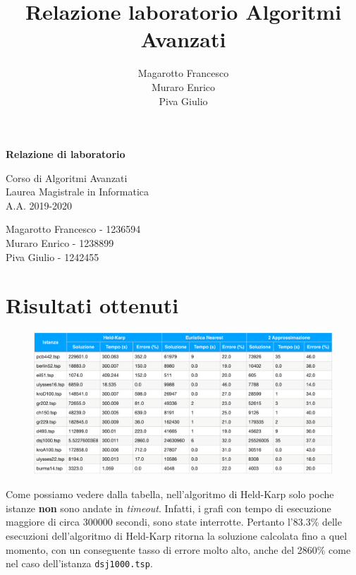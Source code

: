 \documentclass[a4paper]{article}
\title{Relazione laboratorio Algoritmi Avanzati}
\author{Magarotto Francesco\\Muraro Enrico\\Piva Giulio}
\begin{document}
\begin{titlepage}
  \vspace*{5cm}
  \begin{center}
    \Large\bfseries
    Relazione di laboratorio
  \end{center}
  \begin{center}
    \large
    Corso di Algoritmi Avanzati\\
    Laurea Magistrale in Informatica\\A.A. 2019-2020
  \end{center}
  \vspace{4cm plus 1fill}
  \begin{flushleft}
    \large
    Magarotto Francesco - 1236594\\Muraro Enrico - 1238899 \\Piva Giulio - 1242455
  \end{flushleft}
\end{titlepage}
\newpage


\section{Risultati ottenuti}
\begin{figure}[H]
	\centering
	\includegraphics[width=17cm]{tabellapdf}
\end{figure}
Come possiamo vedere dalla tabella, nell'algoritmo di Held-Karp solo poche istanze \textbf{non} sono andate in \textit{timeout}. Infatti, i grafi con tempo di esecuzione maggiore di circa 300000 secondi, sono state interrotte. Pertanto l'83.3\% delle esecuzioni dell'algoritmo di Held-Karp ritorna la soluzione calcolata fino a quel momento, con un conseguente tasso di errore molto alto, anche del 2860\% come nel caso dell'istanza \texttt{dsj1000.tsp}.
\end{document}
